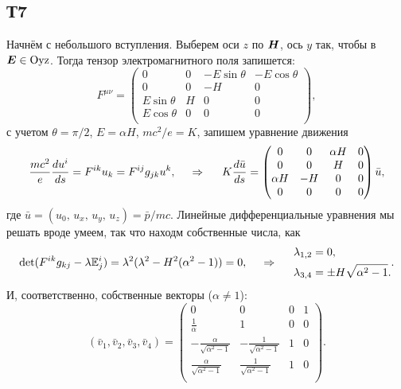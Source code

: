 \subsection*{Т7}
Начнём с небольшого вступления.
Выберем оси $z$ по $\mbox{\boldmath $H$}$, ось $y$ так, чтобы в $ \mbox{\boldmath $E$} \in \text{Oyz}$.
Тогда тензор электромагнитного поля запишется:
\begin{equation*}
	F^{\mu \nu} = 
	\begin{pmatrix}
	    0 & 0 & -E \sin \theta  & -E \cos \theta \\
	    0 & 0 & -H & 0 \\
	    E \sin \theta & H & 0 & 0 \\
	    E \cos \theta & 0 & 0 & 0 \\
	\end{pmatrix},
\end{equation*}
с учетом $\theta = \pi/2$, $E = \alpha H$, $m c^2 / e = K$, запишем уравнение движения
\begin{equation*}
	 \frac{m c^2}{e} \frac{d u^i}{d s} = F^{ik} u_k = F^{ij} g_{jk} u^k,
	 \hspace{0.5cm} \Rightarrow \hspace{0.5cm}
	 K \frac{d \bar{u}}{d s}  = \begin{pmatrix}
	     0 & 0 & \alpha H  & 0 \\
	     0 & 0 & H  & 0 \\
	     \alpha H & -H & 0 & 0 \\
	     0 & 0 & 0 & 0 \\
	 \end{pmatrix} \bar{u},
\end{equation*}
где $\bar{u} = (u_0, \, u_x,\, u_y,\, u_z) = \bar{p} / m c$. 
Линейные дифференциальные уравнения мы решать вроде умеем, так что находм собственные числа, как
\begin{equation*}
	\det (F^{ik} g_{kj} - \lambda \mathbb{E}^i_j) = \lambda^2 (\lambda^2 - H^2 (\alpha^2-1)) = 0,
	\hspace{0.5cm} \Rightarrow \hspace{0.5cm}
	\begin{aligned}
	    \lambda_{1, 2} &= 0, \\
	    \lambda_{3, 4} &= \pm H \sqrt{\alpha^2 - 1}.
	\end{aligned}.
\end{equation*}
И, соответственно, собственные векторы ($\alpha \neq 1$):
\begin{equation*}
	(\bar{v}_1, \bar{v}_2, \bar{v}_3, \bar{v}_4) = 
	\left(
	\begin{array}{cccc}
	 0 & 0 & 0 & 1 \\
	 \frac{1}{\alpha } & 1 & 0 & 0 \\
	 -\frac{\alpha }{\sqrt{\alpha ^2-1}} & -\frac{1}{\sqrt{\alpha ^2-1}} & 1 & 0 \\
	 \frac{\alpha }{\sqrt{\alpha ^2-1}} & \frac{1}{\sqrt{\alpha ^2-1}} & 1 & 0 \\
	\end{array}
	\right).
\end{equation*}

